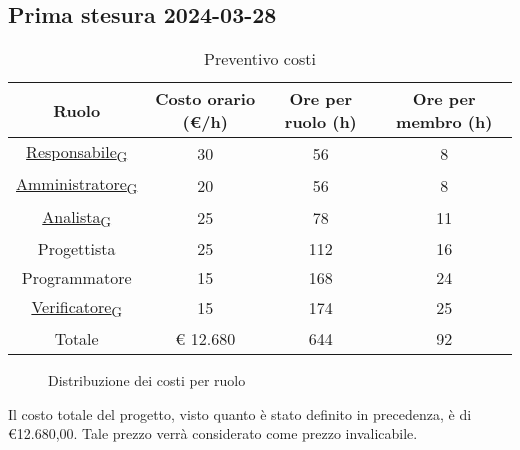 \subsection{Prima stesura 2024-03-28}
\begin{table}[!h]
	\centering
		\begin{tabular}{ | c | c | c | c | }
			\hline
			\textbf{Ruolo}   & \textbf{Costo orario (€/h)} & \textbf{Ore per ruolo (h)} & \textbf{Ore per membro (h)} \\
			\hline
			\href{https://7last.github.io/docs/rtb/documentazione-interna/glossario\#responsabile}{Responsabile\textsubscript{G}}   & 30           & 56            & 8              \\
			\href{https://7last.github.io/docs/rtb/documentazione-interna/glossario\#amministratore}{Amministratore\textsubscript{G}} & 20           & 56            & 8              \\
			\href{https://7last.github.io/docs/rtb/documentazione-interna/glossario\#analista}{Analista\textsubscript{G}}       & 25           & 78            & 11             \\
			Progettista    & 25           & 112           & 16             \\
			Programmatore  & 15           & 168           & 24             \\
			\href{https://7last.github.io/docs/rtb/documentazione-interna/glossario\#verificatore}{Verificatore\textsubscript{G}}   & 15           & 174           & 25             \\
			\hline
			Totale         & € 12.680     & 644           & 92             \\
			\hline
		\end{tabular}
        \caption{Preventivo costi}
\end{table}
\begin{figure}[!h]
    \centering
    \caption{Distribuzione dei costi per ruolo}
\end{figure}
\begin{flushleft}
Il costo totale del progetto, visto quanto è stato definito in precedenza, è di €12.680,00. Tale prezzo verrà considerato come prezzo invalicabile.
\end{flushleft}
